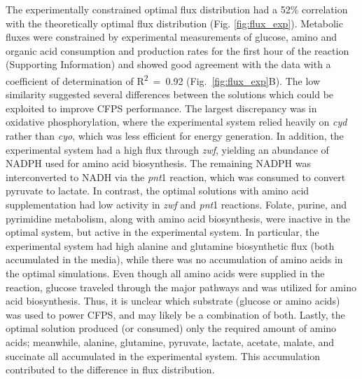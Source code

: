 \documentclass[journal=asbcd6,manuscript=article]{achemso}
\begin{document}
The experimentally constrained optimal flux distribution had a 52\% correlation with the theoretically optimal flux distribution (Fig. \ref{fig:flux_exp}).
Metabolic fluxes were constrained by experimental measurements of glucose, amino and organic acid consumption and production rates for the first hour of the reaction (Supporting Information) and showed good agreement with the data with a coefficient of determination of R\textsuperscript{2}~=~0.92 (Fig.~\ref{fig:flux_exp}B).
The low similarity suggested several differences between the solutions which could be exploited to improve CFPS performance.
The largest discrepancy was in oxidative phosphorylation, where the experimental system relied heavily on \textit{cyd} rather than \textit{cyo}, which was less efficient for energy generation.
In addition, the experimental system had a high flux through \textit{zwf}, yielding an abundance of NADPH used for amino acid biosynthesis.
The remaining NADPH was interconverted to NADH via the \textit{pnt}1 reaction, which was consumed to convert pyruvate to lactate.
In contrast, the optimal solutions with amino acid supplementation had low activity in \textit{zwf} and \textit{pnt}1 reactions.
Folate, purine, and pyrimidine metabolism, along with amino acid biosynthesis, were inactive in the optimal system, but active in the experimental system.
In particular, the experimental system had high alanine and glutamine biosynthetic flux (both accumulated in the media), while there was no accumulation of amino acids in the optimal simulations.
Even though all amino acids were supplied in the reaction, glucose traveled through the major pathways and was utilized for amino acid biosynthesis.
Thus, it is unclear which substrate (glucose or amino acids) was used to power CFPS, and may likely be a combination of both.
Lastly, the optimal solution produced (or consumed) only the required amount of amino acids;
meanwhile,  alanine, glutamine, pyruvate, lactate, acetate, malate, and succinate all accumulated in the experimental system.
This accumulation contributed to the difference in flux distribution.

\end{document}
